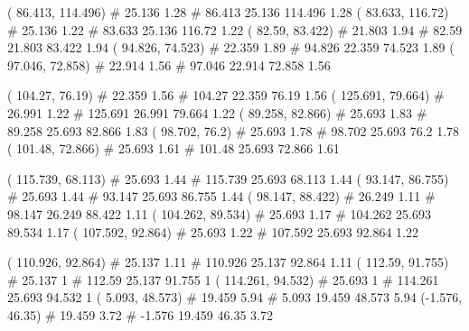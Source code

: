 \documentclass[a4paper,openbib,10pt]{article}
\newenvironment{treegraph}{\begin{graph}}{\end{graph}}
\begin{document}
\begin{treegraph}
  ( 86.413, 114.496) #     25.136    1.28
   #    86.413    25.136    114.496    1.28
  ( 83.633, 116.72) #     25.136    1.22
   #    83.633    25.136    116.72    1.22
  ( 82.59, 83.422) #     21.803    1.94
   #    82.59    21.803    83.422    1.94
  ( 94.826, 74.523) #     22.359    1.89
   #    94.826    22.359    74.523    1.89
  ( 97.046, 72.858) #     22.914    1.56
   #    97.046    22.914    72.858    1.56

  ( 104.27, 76.19) #     22.359    1.56
   #    104.27    22.359    76.19    1.56
  ( 125.691, 79.664) #     26.991    1.22
   #    125.691    26.991    79.664    1.22
  ( 89.258, 82.866) #     25.693    1.83
   #    89.258    25.693    82.866    1.83
  ( 98.702, 76.2) #     25.693    1.78
   #    98.702    25.693    76.2    1.78
  ( 101.48, 72.866) #     25.693    1.61
   #    101.48    25.693    72.866    1.61

  ( 115.739, 68.113) #     25.693    1.44
   #    115.739    25.693    68.113    1.44
  ( 93.147, 86.755) #     25.693    1.44
   #    93.147    25.693    86.755    1.44
  ( 98.147, 88.422) #     26.249    1.11
   #    98.147    26.249    88.422    1.11
  ( 104.262, 89.534) #     25.693    1.17
   #    104.262    25.693    89.534    1.17
  ( 107.592, 92.864) #     25.693    1.22
   #    107.592    25.693    92.864    1.22

  ( 110.926, 92.864) #     25.137    1.11
   #    110.926    25.137    92.864    1.11
  ( 112.59, 91.755) #     25.137    1
   #    112.59    25.137    91.755    1
  ( 114.261, 94.532) #     25.693    1
   #    114.261    25.693    94.532    1
  ( 5.093, 48.573) #     19.459    5.94
   #    5.093    19.459    48.573    5.94
  (-1.576, 46.35) #     19.459    3.72
   #    -1.576    19.459    46.35    3.72


\end{treegraph}
\end{document}
